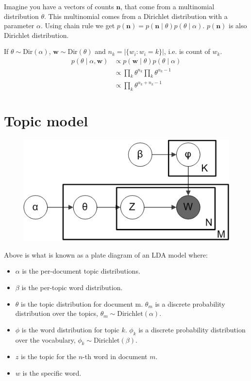 \documentclass{article}
\begin{document}
Imagine you have a vectors of counts $\mathbf{n}$, that come from a multinomial distribution $\theta$. This multinomial comes from a Dirichlet distribution with a parameter $\alpha$.
Using chain rule we get $p(\mathbf{n}) = p(\mathbf{n}\mid \theta)p(\theta \mid \alpha)$. $p(\mathbf{n})$ is also Dirichlet distribution.

If $\theta \sim \text{Dir}(\alpha)$, $\mathbf{w} \sim \text{Dir}(\theta)$ and $n_k = \lvert{\{w_i: w_i =k \}}\rvert$, i.e. is count of $w_k$. 
\begin{align*}
p(\theta \mid \alpha, \mathbf{w}) &\propto p(\mathbf{w} \mid \theta) p(\theta \mid \alpha) \\
&\propto \prod_{k} {\theta}^{n_k} \prod_{k} {\theta}^{\alpha_k -1} \\
&\propto \prod_{k} {\theta}^{\alpha_k + n_k -1}
\end{align*}

\section{Topic model}
\begin{figure}[hbt!]
\centering
 \includegraphics[width=0.7\linewidth]{figures/tmpd.png}
\end{figure}

Above is what is known as a plate diagram of an LDA model where:
\begin{itemize}
\item $\alpha$ is the per-document topic distributions.
\item $\beta$ is the per-topic word distribution.
\item $\theta$ is the topic distribution for document m. $\theta_m$ is a discrete probability distribution over the topics, $\theta_m \sim \text{Dirichlet}(\alpha)$.
\item $\phi$ is the word distribution for topic $k$. $\phi_k$ is a discrete probability distribution over the vocabulary, $\phi_k \sim \text{Dirichlet}(\beta)$.
\item $z$ is the topic for the $n$-th word in document $m$.
\item $w$ is the specific word.
\end{itemize}
\end{document}
